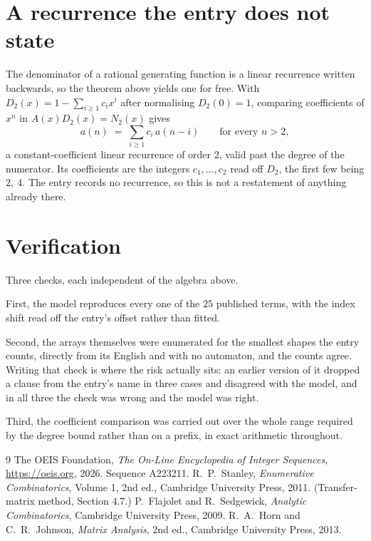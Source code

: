 \documentclass[11pt,a4paper]{article}
\theoremstyle{plain}
\theoremstyle{definition}
\begin{document}
\section{A recurrence the entry does not state}

The denominator of a rational generating function is a linear recurrence written backwards, so
the theorem above yields one for free. With $D_2(x)=1-\sum_{i\ge1}c_ix^i$ after normalising
$D_2(0)=1$, comparing coefficients of $x^n$ in $A(x)D_2(x)=N_2(x)$ gives
\[
a(n)\;=\;\sum_{i\ge1}c_i\,a(n-i)\qquad\text{for every }n>2,
\]
a constant-coefficient linear recurrence of order $2$, valid past the degree of the
numerator. Its coefficients are the integers $c_1,\dots,c_{2}$ read off $D_2$, the first few being $2,\ 4$. The entry records no recurrence, so this is not a restatement of anything
already there.

\section{Verification}

Three checks, each independent of the algebra above.

First, the model reproduces every one of the $25$ published terms, with the index shift
read off the entry's offset rather than fitted.

Second, the arrays themselves were enumerated for the smallest shapes the entry counts,
directly from its English and with no automaton, and the counts agree. Writing that check is
where the risk actually sits: an earlier version of it dropped a clause from the entry's name
in three cases and disagreed with the model, and in all three the check was wrong and the model
was right.

Third, the coefficient comparison was carried out over the whole range required by the degree
bound rather than on a prefix, in exact arithmetic throughout.

\begin{thebibliography}{9}
 The OEIS Foundation, \emph{The On-Line Encyclopedia of Integer
Sequences}, \url{https://oeis.org}, 2026. Sequence A223211.
 R.~P.~Stanley, \emph{Enumerative Combinatorics}, Volume 1, 2nd ed.,
Cambridge University Press, 2011. (Transfer-matrix method, Section 4.7.)
 P.~Flajolet and R.~Sedgewick, \emph{Analytic Combinatorics}, Cambridge
University Press, 2009.
 R.~A.~Horn and C.~R.~Johnson, \emph{Matrix Analysis}, 2nd ed., Cambridge
University Press, 2013.
\end{thebibliography}
\end{document}

